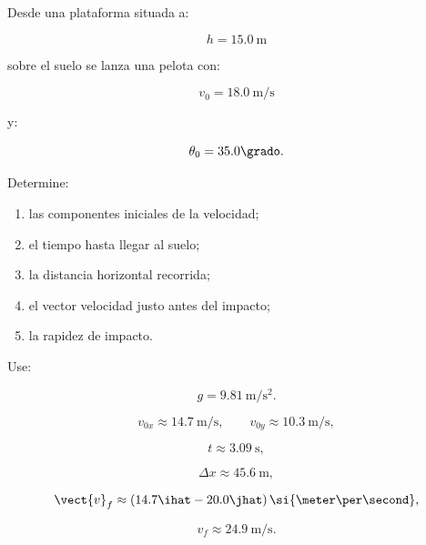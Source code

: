\begin{ejercicio}
Desde una plataforma situada a:

\[
h=\SI{15.0}{\meter}
\]

sobre el suelo se lanza una pelota con:

\[
v_0=\SI{18.0}{\meter\per\second}
\]

y:

\[
\theta_0=35.0\grado.
\]

Determine:

\begin{enumerate}[label=\alph*)]
    \item las componentes iniciales de la velocidad;
    \item el tiempo hasta llegar al suelo;
    \item la distancia horizontal recorrida;
    \item el vector velocidad justo antes del impacto;
    \item la rapidez de impacto.
\end{enumerate}

Use:

\[
g=\SI{9.81}{\meter\per\second\squared}.
\]
\end{ejercicio}

\begin{respuesta}
\[
v_{0x}\approx\SI{14.7}{\meter\per\second},
\qquad
v_{0y}\approx\SI{10.3}{\meter\per\second},
\]

\[
t\approx\SI{3.09}{\second},
\]

\[
\Delta x\approx\SI{45.6}{\meter},
\]

\[
\vect{v}_f
\approx
(14.7\ihat-20.0\jhat)
\,\si{\meter\per\second},
\]

\[
\boxed{
v_f\approx\SI{24.9}{\meter\per\second}
}.
\]
\end{respuesta}

